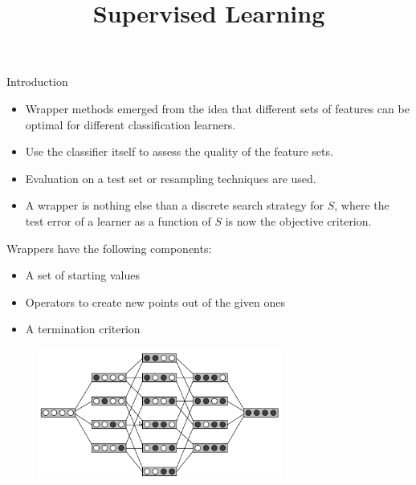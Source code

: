 \documentclass[11pt,compress,t,notes=noshow, xcolor=table]{beamer}
\title{Supervised Learning}
\date{}
\begin{document}

  \begin{vbframe}{Introduction}

    \begin{itemize}
      \item Wrapper methods emerged from the idea that different sets of features can be optimal for different classification learners.
      \item Use the classifier itself to assess the quality of the feature sets.
      \item Evaluation on a test set or resampling techniques are used.
      \item A wrapper is nothing else than a discrete search strategy for $S$, where the test error of a learner as a function of $S$ is now the objective criterion.

    \end{itemize}


    \framebreak

    Wrappers have the following components:


    \begin{itemize}
      \item A set of starting values
      \item Operators to create new points out of the given ones
      \item A termination criterion
    \end{itemize}


    \begin{figure}
      \includegraphics[width=8cm]{figure_man/varsel_space.png}
    \end{figure}


  \end{vbframe}
  
\end{document}
